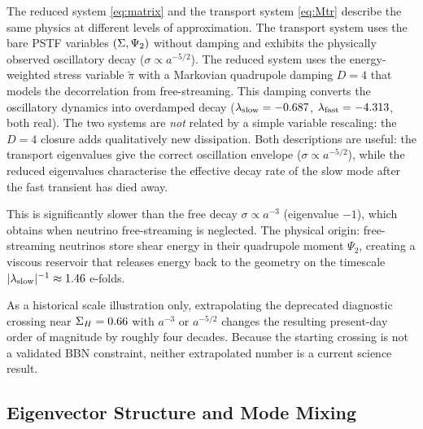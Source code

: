 \begin{remark}
The reduced system \eqref{eq:matrix} and the transport system \eqref{eq:Mtr} describe the same physics at different levels of approximation.  The transport system uses the bare PSTF variables $(\Sigma, \Psi_2)$ without damping and exhibits the physically observed oscillatory decay ($\sigma \propto a^{-5/2}$).  The reduced system uses the energy-weighted stress variable $\tilde\pi$ with a Markovian quadrupole damping $D = 4$ that models the decorrelation from free-streaming.  This damping converts the oscillatory dynamics into overdamped decay ($\lambda_{\rm slow} = -0.687$, $\lambda_{\rm fast} = -4.313$, both real).  The two systems are \emph{not} related by a simple variable rescaling: the $D = 4$ closure adds qualitatively new dissipation.  Both descriptions are useful: the transport eigenvalues give the correct oscillation envelope ($\sigma \propto a^{-5/2}$), while the reduced eigenvalues characterise the effective decay rate of the slow mode after the fast transient has died away.
\end{remark}

This is significantly slower than the free decay $\sigma \propto a^{-3}$ (eigenvalue $-1$), which obtains when neutrino free-streaming is neglected.  The physical origin: free-streaming neutrinos store shear energy in their quadrupole moment $\Psi_2$, creating a viscous reservoir that releases energy back to the geometry on the timescale $|\lambda_{\rm slow}|^{-1} \approx 1.46$ e-folds.

As a historical scale illustration only, extrapolating the deprecated diagnostic crossing near $\Sigma_H=0.66$ with $a^{-3}$ or $a^{-5/2}$ changes the resulting present-day order of magnitude by roughly four decades.  Because the starting crossing is not a validated BBN constraint, neither extrapolated number is a current science result.

\subsection{Eigenvector Structure and Mode Mixing}

